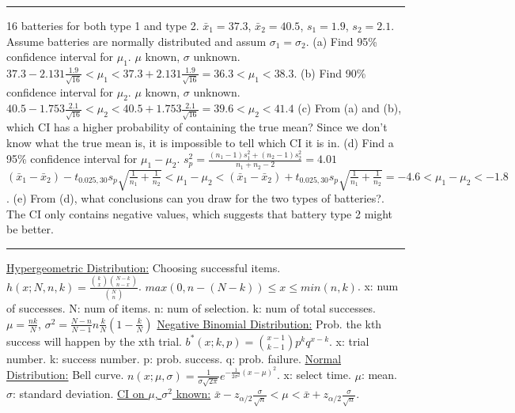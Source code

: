 \documentclass[9pt]{article}
\newcommand*\mean[1]{\bar{#1}}
\begin{document}
\begin{multicols*}{2}
    \rule{0.5\textwidth}{0.4pt}
    16 batteries for both type 1 and type 2. $\mean{x}_1=37.3$, $\mean{x}_2=40.5$, $s_1=1.9$, $s_2=2.1$. Assume batteries are normally distributed and assum $\sigma_1 = \sigma_2$.\newline
    (a) Find 95\% confidence interval for $\mu_1$. $\mu$ known, $\sigma$ unknown. 
    $37.3 - 2.131\frac{1.9}{\sqrt{16}} < \mu_1 < 37.3 + 2.131\frac{1.9}{\sqrt{16}} = 36.3 < \mu_1 < 38.3$.\newline
    (b) Find 90\% confidence interval for $\mu_2$. $\mu$ known, $\sigma$ unknown.
    $40.5 -1.753 \frac{2.1}{\sqrt{16}} < \mu_2 < 40.5 + 1.753 \frac{2.1}{\sqrt{16}} = 39.6 < \mu_2 < 41.4$\newline
    (c) From (a) and (b), which CI has a higher probability of containing the true mean?
    Since we don't know what the true mean is, it is impossible to tell which CI it is in.\newline
    (d) Find a 95\% confidence interval for $\mu_1-\mu_2$. $s_p^2=\frac{(n_1-1)s_1^2 + (n_2-1)s^2_2}{n_1+n_2-2} = 4.01$
    $(\mean{x}_1 - \mean{x}_2)-t_{0.025,30}s_p\sqrt{\frac{1}{n_1}+\frac{1}{n_2}} < \mu_1 - \mu_2 < (\mean{x}_1 - \mean{x}_2)+t_{0.025,30}s_p\sqrt{\frac{1}{n_1}+\frac{1}{n_2}}
    = -4.6 < \mu_1 - \mu_2 < -1.8$.\newline
    (e) From (d), what conclusions can you draw for the two types of batteries?.
    The CI only contains negative values, which suggests that battery type 2 might be better.
    \rule{0.5\textwidth}{0.4pt}
    \uline{Hypergeometric Distribution:} Choosing successful items. $h(x;N,n,k)=\frac{\binom{k}{x}\binom{N-k}{n-x}}
    {\binom{N}{n}}$. $max(0,n-(N-k))\leq x \leq min(n,k)$. x: num of successes. 
    N: num of items. n: num of selection. k: num of total successes. $\mu=\frac{nk}{N}$,
    $\sigma^2=\frac{N-n}{N-1}n\frac{k}{N}(1-\frac{k}{N})$\newline
    \uline{Negative Binomial Distribution:} Prob. the kth success will happen by the xth trial.
    $b^*(x;k,p)=\binom{x-1}{k-1}p^kq^{x-k}$. x: trial number. k: success number. p: prob. success.
    q: prob. failure.\newline
    \uline{Normal Distribution:} Bell curve. $n(x;\mu,\sigma)=\frac{1}{\sigma\sqrt{2\pi}}e^{-\frac{1}{2\sigma^2}(x-\mu)^2}$.
    x: select time. $\mu$: mean. $\sigma$: standard deviation.\newline
    \uline{CI on $\mu$, $\sigma^2$ known:} $\bar{x}-z_{\alpha/2}\frac{\sigma}{\sqrt{n}} < \mu < \bar{x}+z_{\alpha/2}\frac{\sigma}{\sqrt{n}}$.\newline

\end{multicols*}
\end{document}
